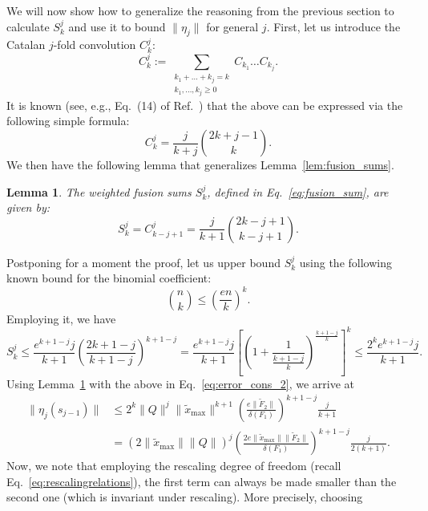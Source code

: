 \documentclass[superscriptaddress,onecolumn,nofootinbib,longbibliography,a4paper,accepted=2026-09-29]{quantumarticle}
\theoremstyle{plain}
\newtheorem{lemma}[thm]{Lemma}
\theoremstyle{definition}
\numberwithin{thm}{section}
\numberwithin{assumption}{section}
\numberwithin{lemma}{section}
\numberwithin{prop}{section}
\numberwithin{cor}{section}
\numberwithin{definition}{section}
\numberwithin{rmk}{section}
\numberwithin{equation}{section}
\begin{document}
We will now show how to generalize the reasoning from the previous section to calculate $S_k^{j}$ and use it to bound $\|\eta_j\|$ for general $j$. First, let us introduce the Catalan $j$-fold convolution $C_k^{j}$:
\begin{equation}
    C_k^{j} := \sum_{\substack{k_1+\dots+k_j = k \\ k_1,\dots, k_j \geq 0 }} C_{k_1} \dots C_{k_j}. 
\end{equation}
It is known (see, e.g., Eq.~(14) of Ref.~\cite{larcombe2003catalan}) that the above can be expressed via the following simple formula:
\begin{equation}
    C_k^{j} = \frac{j}{k+j} \binom{2k+j-1}{k}.
\end{equation}
We then have the following lemma that generalizes Lemma~\ref{lem:fusion_sums}.
\begin{lemma}
    \label{lem:fusion_sums_general}
    The weighted fusion sums $S_k^{j}$, defined in Eq.~\eqref{eq:fusion_sum}, are given by:
    \begin{equation}
        S_k^{j} = C^{j}_{k-j+1} = \frac{j}{k+1} \binom{2k-j+1}{k-j+1}.
    \end{equation}
\end{lemma}
Postponing for a moment the proof, let us upper bound $S_k^{j}$ using the following known bound for the binomial coefficient:
\begin{equation}
   \binom{n}{k} \leq \left(\frac{e n}{k}\right)^k.
\end{equation}
Employing it, we have
\begin{equation}
    S_k^{j} \leq \frac{ e^{k+1-j} j}{k+1} \left(\frac{2k+1-j}{k+1-j}\right)^{k+1-j} = \frac{ e^{k+1-j} j}{k+1} \left[\left(1 + \frac{1}{\frac{k+1-j}{k}}\right)^{\frac{k+1-j}{k}}\right]^k \leq \frac{ 2^k e^{k+1-j} j}{k+1}.
\end{equation}
Using Lemma~\ref{lem:fusion_sums_general} with the above in Eq.~\eqref{eq:error_cons_2}, we arrive at
\begin{align}
    \|\eta_j(s_{j-1})\| &\leq  2^k \|Q\|^j  \|\tilde{x}_{\mathrm{max}}\|^{k+1} \left(\frac{e\|\tilde{F}_2\|}{\delta(F_1)}\right)^{k+1-j}\frac{j}{k+1}\\
    & = \left( 2 \|\tilde{x}_{\mathrm{max}}\| \|Q\|  \right)^j \left(\frac{2e\|\tilde{x}_{\mathrm{max}}\|\|\tilde{F}_2\|}{\delta(F_1)}\right)^{k+1-j}\frac{j}{2(k+1)}.
\end{align}
Now, we note that employing the rescaling degree of freedom (recall Eq.~\eqref{eq:rescalingrelations}), the first term can always be made smaller than the second one (which is invariant under rescaling). More precisely, choosing 
\end{document}
